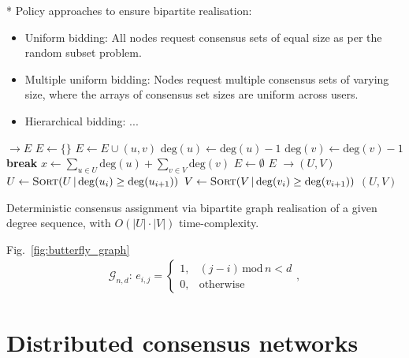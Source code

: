 \documentclass[twocolumn, aps, amsmath, amssymb, nofootinbib, superscriptaddress, longbibliography, floatfix, eqsecnum, rmp]{revtex4-2}
\let\oldalgorithmic\algorithmic
\let\endoldalgorithmic\endalgorithmic
\renewenvironment{algorithmic}
{\begin{adjustwidth}{-1em}{}\oldalgorithmic}
{\endoldalgorithmic\end{adjustwidth}}
\begin{document}
* Policy approaches to ensure bipartite realisation:
\begin{itemize}
	\item Uniform bidding: All nodes request consensus sets of equal size as per the random subset problem.
	\item Multiple uniform bidding: Nodes request multiple consensus sets of varying size, where the arrays of consensus set sizes are uniform across users.
	\item Hierarchical bidding: ...
\end{itemize}

\begin{algorithm}[H]
\begin{algorithmic}
 $\to E$
	\State $E \gets \{\}$ 
	 
				\State $E \gets E \cup (u,v)$ 
				\State $\mathrm{deg}(u) \gets \mathrm{deg}(u)-1$ 
				\State $\mathrm{deg}(v) \gets \mathrm{deg}(v)-1$
					\State \textbf{break}
				\EndIf
			\EndIf
		\EndFor
		\EndIf
	\EndFor
	\State $x \gets \sum_{u\in U} \mathrm{deg}(u) + \sum_{v\in V} \mathrm{deg}(v)$ 
		\State $E \gets \emptyset$ 
	\EndIf
	\State \Return $E$
\EndFunction
\State
{} $\to (U,V)$
	\State $U \gets \textsc{Sort}(U \,|\, \mathrm{deg}(u_i)\geq\mathrm{deg}(u_{i+1}))$ 
	\State $V \gets \textsc{Sort}(V \,|\, \mathrm{deg}(v_i)\geq\mathrm{deg}(v_{i+1}))$ 
	\State \Return $(U,V)$
\EndFunction
\end{algorithmic}
\caption{\cite{Havel1955, Hakimi62} Deterministic consensus assignment via bipartite graph realisation of a given degree sequence, with \mbox{$O(|U|\cdot |V|)$} time-complexity.} \label{alg:initial_assignment}
\end{algorithm}

Fig.~\ref{fig:butterfly_graph}
\begin{align}
	\mathcal{G}_{n,d}:\, e_{i,j} = \begin{cases} 
      1, & (j-i)\, \mathrm{mod}\, n < d\\
      0, & \mathrm{otherwise} 
   \end{cases},
\end{align}


\section{Distributed consensus networks} \label{sec:DCN}
\end{document}
